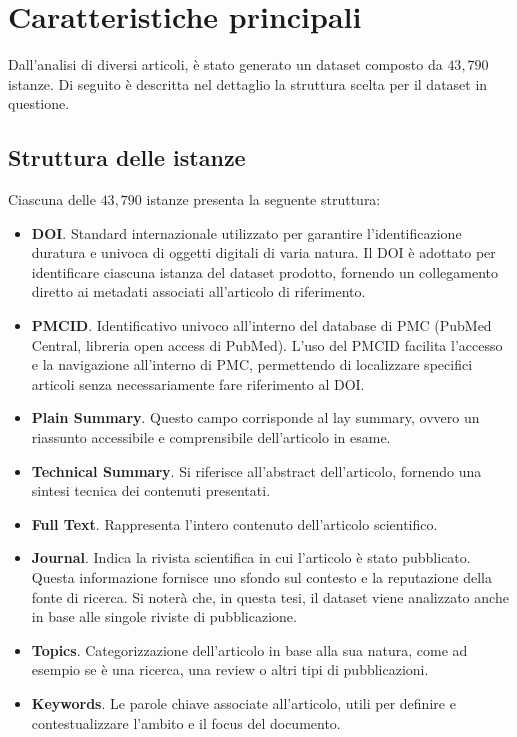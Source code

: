 \documentclass[12pt,a4paper,twoside,openright]{book}
\begin{document}
\section{Caratteristiche principali} 
Dall'analisi di diversi articoli, è stato generato un dataset composto da $43,790$ istanze.  Di seguito è descritta nel dettaglio la struttura scelta per il dataset in questione.

\subsection{Struttura delle istanze}
Ciascuna delle $43,790$ istanze presenta la seguente struttura:
\begin{itemize}
    \item \textbf{DOI}. Standard internazionale utilizzato per garantire l'identificazione duratura e univoca di oggetti digitali di varia natura. Il DOI è adottato per identificare ciascuna istanza del dataset prodotto, fornendo un collegamento diretto ai metadati associati all'articolo di riferimento.
    \item \textbf{PMCID}. Identificativo univoco all'interno del database di PMC (PubMed Central, libreria open access di PubMed). L'uso del PMCID facilita l'accesso e la navigazione all'interno di PMC, permettendo di localizzare specifici articoli senza necessariamente fare riferimento al DOI.
    \item \textbf{Plain Summary}. Questo campo corrisponde al lay summary, ovvero un riassunto accessibile e comprensibile dell'articolo in esame.
    \item \textbf{Technical Summary}. Si riferisce all'abstract dell'articolo, fornendo una sintesi tecnica dei contenuti presentati.
    \item \textbf{Full Text}. Rappresenta l'intero contenuto dell'articolo scientifico.
    \item \textbf{Journal}. Indica la rivista scientifica in cui l'articolo è stato pubblicato. Questa informazione fornisce uno sfondo sul contesto e la reputazione della fonte di ricerca. Si noterà che, in questa tesi, il dataset viene analizzato anche in base alle singole riviste di pubblicazione.
    \item \textbf{Topics}. Categorizzazione dell'articolo in base alla sua natura, come ad esempio se è una ricerca, una review o altri tipi di pubblicazioni.
    \item \textbf{Keywords}. Le parole chiave associate all'articolo, utili per definire e contestualizzare l'ambito e il focus del documento.
\end{itemize}
\end{document}
